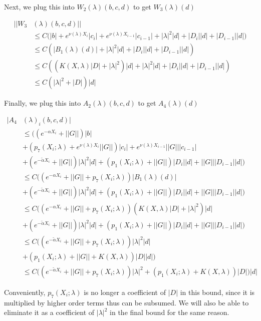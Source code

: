 \documentclass[12pt]{article}
\begin{document}
\begin{enumerate}
Next, we plug this into $W_2(\lambda)(b, c, d)$ to get $W_3(\lambda)(d)$

\begin{align*}
||W_3&(\lambda)(b,c,d)|| \\
&\leq C \Big( |b| + e^{\nu(\lambda)X_i} |c_i| + e^{\nu(\lambda)X_{i-1}} |c_{i-1}| 
+ |\lambda|^2 |d| + |D_i||d| + |D_{i-1}||d|) \\
&\leq C( |B_1(\lambda)(d)|+ |\lambda|^2 |d| + |D_i||d| + |D_{i-1}||d|) \\
&\leq C( ( K(X, \lambda) |D|+ |\lambda|^2 )|d| + |\lambda|^2 |d| + |D_i||d| + |D_{i-1}||d|) \\
&\leq C( |\lambda|^2 + |D|)|d|
\end{align*}

Finally, we plug this into $A_2(\lambda)(b, c, d)$ to get $A_4(\lambda)(d)$

\begin{align*}
|A_4&(\lambda)_i(b, c, d)| \\
&\leq \Big( (e^{-\alpha X_i} + ||G|| )|b| \\
&+ (p_7(X_i; \lambda) + e^{\nu(\lambda)X_i} ||G||) |c_i| + e^{\nu(\lambda)X_{i-1}} ||G|| |c_{i-1}| \\
&+ (e^{-\tilde{\alpha} X_i} + ||G||)|\lambda|^2 |d| 
+ (p_1(X_i; \lambda) + ||G||) |D_i| |d| 
+ ||G|| |D_{i-1}| |d| \Big) \\
&\leq C \Big( (e^{-\alpha X_i} + ||G|| + p_7(X_i; \lambda))|B_1(\lambda)(d)|\\
&+ (e^{-\tilde{\alpha} X_i} + ||G||)|\lambda|^2 |d| 
+ (p_1(X_i; \lambda) + ||G||) |D_i| |d| 
+ ||G|| |D_{i-1}| |d| \Big) \\
&\leq C \Big( (e^{-\alpha X_i} + ||G|| + p_7(X_i; \lambda))
( K(X, \lambda) |D|+ |\lambda|^2 )|d|\\
&+ (e^{-\tilde{\alpha} X_i} + ||G||)|\lambda|^2 |d| 
+ (p_1(X_i; \lambda) + ||G||) |D_i| |d| 
+ ||G|| |D_{i-1}| |d| \Big) \\
&\leq C \Big( (e^{-\tilde{\alpha} X_i} + ||G|| + p_7(X_i; \lambda))|\lambda|^2 |d| \\ 
&+ (p_1(X_i; \lambda) + ||G|| + K(X, \lambda) ) |D| |d| \Big) \\
&\leq C \Big( (e^{-\tilde{\alpha} X_i} + ||G|| + p_7(X_i; \lambda))|\lambda|^2 + (p_1(X_i; \lambda) + K(X, \lambda) ) |D| \Big)|d|
\end{align*}

Conveniently, $p_7(X_i; \lambda)$ is no longer a coefficient of $|D|$ in this bound, since it is multiplied by higher order terms thus can be subsumed. We will also be able to eliminate it as a coefficient of $|\lambda|^2$ in the final bound for the same reason.


\end{enumerate}
\end{document}

